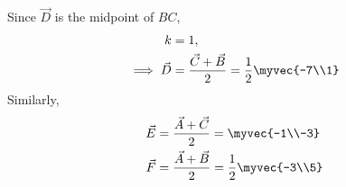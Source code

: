 \solution
Since $\vec{D}$ is the midpoint of $BC$,
\begin{align}
k &= 1,\\
\implies \vec{D} &= \frac{\vec{C} + \vec{B}}{2}
= \frac{1}{2}\myvec{-7\\1}
	\label{eq:median-d}
\end{align}
Similarly,
\begin{align}
	\label{eq:median-e}
\vec{E} &= \frac{\vec{A} + \vec{C}}{2}
= \myvec{-1\\-3}\\
\vec{F} &= \frac{\vec{A} + \vec{B}}{2}
= \frac{1}{2}\myvec{-3\\5}
	\label{eq:median-f}
\end{align}
